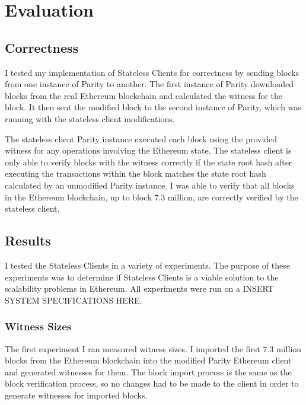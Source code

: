\documentclass[12pt]{article}
\newcommand{\System}{Stateless Clients\xspace}
\begin{document}
\section{Evaluation}

\subsection{Correctness}

I tested my implementation of \System for correctness by sending blocks from one instance of Parity to another. The first instance of Parity downloaded blocks from the real Ethereum blockchain and calculated the witness for the block. It then sent the modified block to the second instance of Parity, which was running with the stateless client modifications.

The stateless client Parity instance executed each block using the provided witness for any operations involving the Ethereum state. The stateless client is only able to verify blocks with the witness correctly if the state root hash after executing the transactions within the block matches the state root hash calculated by an unmodified Parity instance. I was able to verify that all blocks in the Ethereum blockchain, up to block 7.3 million, are correctly verified by the stateless client.

\subsection{Results} \label{subsection:results}

I tested the \System in a variety of experiments. The purpose of these experiments was to determine if \System is a viable solution to the scalability problems in Ethereum. All experiments were run on a INSERT SYSTEM SPECIFICATIONS HERE.

\subsubsection{Witness Sizes}

The first experiment I ran measured witness sizes. I imported the first 7.3 million blocks from the Ethereum blockchain into the modified Parity Ethereum client and generated witnesses for them. The block import process is the same as the block verification process, so no changes had to be made to the client in order to generate witnesses for imported blocks.
\end{document}
